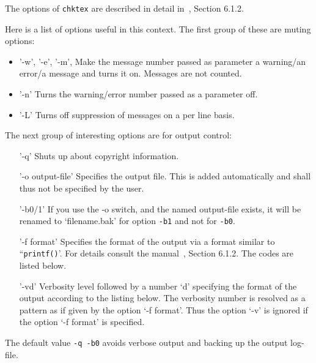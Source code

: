 The options of \texttt{chktex} 
are described in detail in~\cite{ChkTeX22}, Section 6.1.2. 

Here is a list of options useful in this context. 
The first group of these are muting options: 
%
\begin{itemize}
\item '-w', '-e', '-m', 
Make the message number passed as parameter 
a warning/an error/a message and turns it on. 
Messages are not counted. 
\item '-n'
Turns the warning/error number passed as a parameter off. 
\item '-L'
Turns off suppression of messages on a per line basis. 
\end{itemize}

The next group of interesting options are for output control: 
%
\begin{itemize}
\item['-q']
Shuts up about copyright information.
\item['-o output-file']
Specifies the output file. This is added automatically 
and shall thus not be specified by the user. 
\item['-b0/1']
If you use the -o switch, and the named output-file exists,
it will be renamed to `filename.bak' for option \texttt{-b1} 
and not for \texttt{-b0}.
\item['-f format']
Specifies the format of the output 
via a format similar to ``\texttt{printf()}'. %
For details consult the manual~\cite{ChkTeX22}, Section 6.1.2. 
The codes are listed below. 
\item['-vd']
Verbosity level followed by a number `d' 
specifying the format of the output according to the listing below. 
The verbosity number is resolved as a pattern 
as if given by the option `-f format'. 
Thus the option `-v' is ignored 
if the option `-f format' is specified. 
\end{itemize}

The default value \texttt{-q -b0} 
avoids verbose output and backing up the output log-file. 

